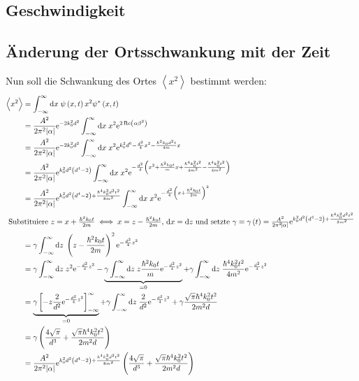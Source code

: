 \subsection{Geschwindigkeit}

\subsection{Änderung der Ortsschwankung mit der Zeit}
Nun soll die Schwankung des Ortes $\left<x^2\right>$ bestimmt werden:
\begin{align*}
	\left<x^2\right>&=\int_{-\infty}^{\infty}\dif x\;\psi\del{x,t}x^2\psi^*\del{x,t}\\
	&=\frac{A^2}{2\pi^2\abs{\alpha}}\ee^{-2k_0^2d^2}\int_{-\infty}^{\infty}\dif x\;x^2\ee^{2\Re\del{\alpha\beta^2}}\\
	&=\frac{A^2}{2\pi^2\abs{\alpha}}\ee^{-2k_0^2d^2}\int_{-\infty}^{\infty}\dif x\;x^2\ee^{k_0^2d^6-\frac{d^2}{4}x^2-\frac{\hbar^2k_0d^2t}{4m}x}\\
	&=\frac{A^2}{2\pi^2\abs{\alpha}}\ee^{k_0^2d^2\del{d^4-2}}\int_{-\infty}^{\infty}\dif x\;x^2
	\ee^{-\frac{d^2}{4}\del{x^2+\frac{\hbar^2k_0t}{m}x+\frac{\hbar^4k_0^2t^2}{4m^2}-\frac{\hbar^4k_0^2t^2}{4m^2}}}\\
	&=\frac{A^2}{2\pi^2\abs{\alpha}}\ee^{k_0^2d^2\del{d^4-2}+\frac{\hbar^4k_0^2d^2t^2}{8m^2}}
	\int_{-\infty}^{\infty}\dif x\;x^2\ee^{-\frac{d^2}{4}\del{x+\frac{\hbar^2k_0t}{2m}}^2}\\
	\intertext{
		Substituiere $z=x+\frac{\hbar^2k_0t}{2m}\iff x=z-\frac{\hbar^2k_0t}{2m}$, $\dif x=\dif z$
		und setzte $\gamma\equiv\gamma\del{t}=\frac{A^2}{2\pi^2\abs{\alpha}}\ee^{k_0^2d^2\del{d^4-2}+\frac{\hbar^4k_0^2d^2t^2}{8m^2}}$
	}
	&=\gamma\int_{-\infty}^{\infty}\dif z\;\del{z-\frac{\hbar^2k_0t}{2m}}^2\ee^{-\frac{d^2}{4}z^2}\\
	&=\gamma\int_{-\infty}^{\infty}\dif z\;z^2\ee^{-\frac{d^2}{4}z^2}-
	\underbrace{\gamma\int_{-\infty}^{\infty}\dif z\;z\frac{\hbar^2k_0t}{m}\ee^{-\frac{d^2}{4}z^2}}_{=0}
	+\gamma\int_{-\infty}^{\infty}\dif z\;\frac{\hbar^4k_0^2t^2}{4m^2}\ee^{-\frac{d^2}{4}z^2}\\
	&=\underbrace{\gamma\left[-z\frac{2}{d^2}\ee^{-\frac{d^2}{4}z^2}\right]_{-\infty}^{\infty}}_{=0}+\gamma\int_{-\infty}^{\infty}\dif z\;
	\frac{2}{d^2}\ee^{-\frac{d^2}{4}z^2}+\gamma\frac{\sqrt{\pi}\hbar^4k_0^2t^2}{2m^2d}\\
	&=\gamma\del{\frac{4\sqrt{\pi}}{d^3}+\frac{\sqrt{\pi}\hbar^4k_0^2t^2}{2m^2d}}\\
	&=\frac{A^2}{2\pi^2\abs{\alpha}}\ee^{k_0^2d^2\del{d^4-2}+\frac{\hbar^4k_0^2d^2t^2}{8m^2}}
	\del{\frac{4\sqrt{\pi}}{d^3}+\frac{\sqrt{\pi}\hbar^4k_0^2t^2}{2m^2d}}\\
\end{align*}

